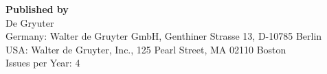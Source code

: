 {\bf Published by}	\\%
De Gryuter	\\
Germany: Walter de Gruyter GmbH, Genthiner Strasse 13, D-10785 Berlin \\
USA: Walter de Gruyter, Inc., 125 Pearl Street, MA 02110 Boston \\

Issues per Year: 4\\[15.5mm]